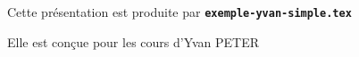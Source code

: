  \item Cette présentation est produite par \texttt{\textbf{exemple-yvan-simple.tex}}
  \item Elle est conçue pour les cours d'Yvan PETER
